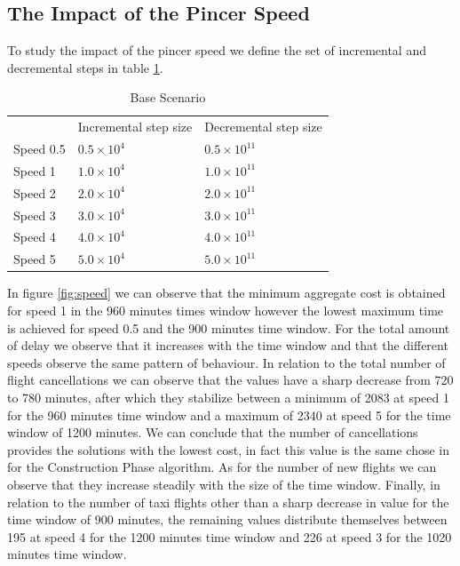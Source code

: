 \subsection{The Impact of the Pincer Speed}\label{sec:pincerSpeed}
To study the impact of the pincer speed we define the set of incremental and decremental steps in table \ref{tbl:pincerSpeed}.

	\begin{table}[h!]
		\centering
		\caption{Base Scenario}
		\label{tbl:pincerSpeed}
		\begin{tabular}{lll}
			\hline
			& Incremental step size     & Decremental step size      \\
			Speed 0.5 & $0.5 \times 10^{4}$ & $0.5 \times 10^{11}$ \\
			Speed 1   & $1.0 \times 10^{4}$ & $1.0 \times 10^{11}$ \\
			Speed 2   & $2.0 \times 10^{4}$ & $2.0 \times 10^{11}$ \\
			Speed 3   & $3.0 \times 10^{4}$ & $3.0 \times 10^{11}$ \\
			Speed 4   & $4.0 \times 10^{4}$ & $4.0 \times 10^{11}$ \\
			Speed 5   & $5.0 \times 10^{4}$ & $5.0 \times 10^{11}$ \\
			\hline
		\end{tabular}
	\end{table} 

In figure \ref{fig:speed} we can observe that the minimum aggregate cost is obtained for speed 1 in the 960 minutes times window however the lowest maximum time is achieved for speed 0.5 and the 900 minutes time window. For the total amount of delay we observe that it increases with the time window and that the different speeds observe the same pattern of behaviour. In relation to the total number of flight cancellations we can observe that the values have a sharp decrease from 720 to 780 minutes, after which they stabilize between a minimum of 2083 at speed 1 for the 960 minutes time window  and a maximum of 2340 at speed 5 for the time window of 1200 minutes. We can conclude that the number of cancellations provides the solutions with the lowest cost, in fact this value is the same chose in \citep{bisaillon2011} for the Construction Phase algorithm. As for the number of new flights we can observe that they increase steadily with the size of the time window. Finally, in relation to the number of taxi flights other than a sharp decrease in value for the time window of 900 minutes, the remaining values distribute themselves between 195 at speed 4 for the 1200 minutes time window and 226 at speed 3 for the 1020 minutes time window.
 
